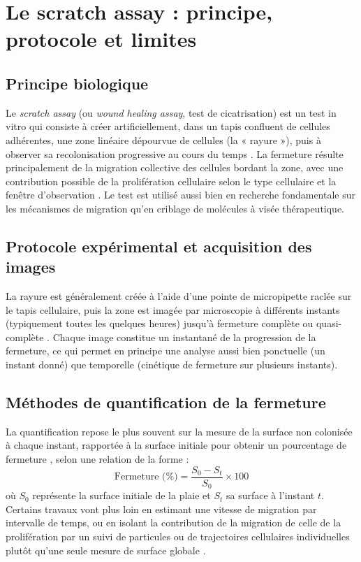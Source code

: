 \documentclass[12pt,a4paper]{report}
\begin{document}
\section{Le scratch assay : principe, protocole et limites}
\label{sec:scratch}

\subsection{Principe biologique}

Le \textit{scratch assay} (ou \textit{wound healing assay}, test de cicatrisation) est un test in vitro qui consiste à créer artificiellement, dans un tapis confluent de cellules adhérentes, une zone linéaire dépourvue de cellules (la « rayure »), puis à observer sa recolonisation progressive au cours du temps \cite{ref13,ref14}. La fermeture résulte principalement de la migration collective des cellules bordant la zone, avec une contribution possible de la prolifération cellulaire selon le type cellulaire et la fenêtre d'observation \cite{ref14}. Le test est utilisé aussi bien en recherche fondamentale sur les mécanismes de migration qu'en criblage de molécules à visée thérapeutique.

\subsection{Protocole expérimental et acquisition des images}

La rayure est généralement créée à l'aide d'une pointe de micropipette raclée sur le tapis cellulaire, puis la zone est imagée par microscopie à différents instants (typiquement toutes les quelques heures) jusqu'à fermeture complète ou quasi-complète \cite{ref13,ref14}. Chaque image constitue un instantané de la progression de la fermeture, ce qui permet en principe une analyse aussi bien ponctuelle (un instant donné) que temporelle (cinétique de fermeture sur plusieurs instants).

\subsection{Méthodes de quantification de la fermeture}

La quantification repose le plus souvent sur la mesure de la surface non colonisée à chaque instant, rapportée à la surface initiale pour obtenir un pourcentage de fermeture \cite{ref9,ref10}, selon une relation de la forme :
\[
\text{Fermeture (\%)} = \frac{S_0 - S_t}{S_0} \times 100
\]
où $S_0$ représente la surface initiale de la plaie et $S_t$ sa surface à l'instant $t$. Certains travaux vont plus loin en estimant une vitesse de migration par intervalle de temps, ou en isolant la contribution de la migration de celle de la prolifération par un suivi de particules ou de trajectoires cellulaires individuelles plutôt qu'une seule mesure de surface globale \cite{ref11}.
\end{document}
